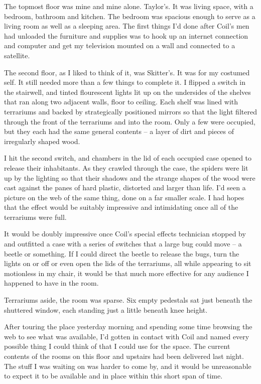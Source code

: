 The topmost floor was mine and mine alone.  Taylor's.  It was living space, with a bedroom, bathroom and kitchen.  The bedroom was spacious enough to serve as a living room as well as a sleeping area.  The first things I'd done after Coil's men had unloaded the furniture and supplies was to hook up an internet connection and computer and get my television mounted on a wall and connected to a satellite.



The second floor, as I liked to think of it, was Skitter's.  It was for my costumed self.  It still needed more than a few things to complete it.  I flipped a switch in the stairwell, and tinted flourescent lights lit up on the undersides of the shelves that ran along two adjacent walls, floor to ceiling.  Each shelf was lined with terrariums and backed by strategically positioned mirrors so that the light filtered through the front of the terrariums and into the room.  Only a few were occupied, but they each had the same general contents – a layer of dirt and pieces of irregularly shaped wood.



I hit the second switch, and chambers in the lid of each occupied case opened to release their inhabitants.  As they crawled through the case, the spiders were lit up by the lighting so that their shadows and the strange shapes of the wood were cast against the panes of hard plastic, distorted and larger than life.  I'd seen a picture on the web of the same thing, done on a far smaller scale.  I had hopes that the effect would be suitably impressive and intimidating once all of the terrariums were full.



It would be doubly impressive once Coil's special effects technician stopped by and outfitted a case with a series of switches that a large bug could move – a beetle or something.  If I could direct the beetle to release the bugs, turn the lights on or off or even open the lids of the terrariums, all while appearing to sit motionless in my chair, it would be that much more effective for any audience I happened to have in the room.



Terrariums aside, the room was sparse.  Six empty pedestals sat just beneath the shuttered window, each standing just a little beneath knee height.



After touring the place yesterday morning and spending some time browsing the web to see what was available, I'd gotten in contact with Coil and named every possible thing I could think of that I could use for the space.  The current contents of the rooms on this floor and upstairs had been delivered last night.  The stuff I was waiting on was harder to come by, and it would be unreasonable to expect it to be available and in place within this short span of time.



